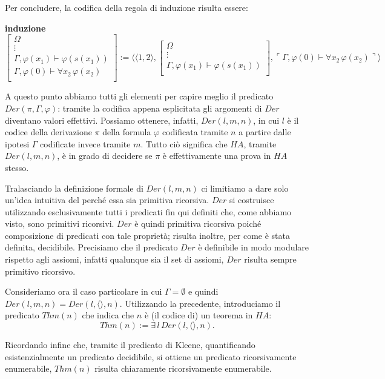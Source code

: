 Per concludere, la codifica della regola di induzione risulta essere:


\vspace{0.5cm}
\textbf{induzione}
{\tiny
$$
\left [
\begin{array}{c}
\Omega\\
\vdots\\
\Gamma, \varphi(x_1) \vdash \varphi(s(x_1))\\
\hline
\Gamma, \varphi(0) \vdash \forall x_2\,\varphi(x_2)\\
\end{array}
\right ]
:= \langle \langle 1, 2 \rangle ,
\left [
\begin{array}{c}
\Omega\\
\vdots\\
\Gamma, \varphi(x_1) \vdash \varphi(s(x_1))\\
\end{array}
\right ],
\ulcorner \Gamma, \varphi(0) \vdash \forall x_2\,\varphi(x_2) \urcorner \rangle
$$}

\vspace{0.5cm}

A questo punto abbiamo tutti gli elementi per capire meglio il predicato  $Der(\pi,\Gamma,\varphi)$: tramite la codifica appena esplicitata gli argomenti di $Der$ diventano valori effettivi. Possiamo ottenere, infatti, $Der(l, m, n)$, in cui $l$ \`e il codice della derivazione $\pi$ della formula $\varphi$ codificata tramite $n$ a partire dalle ipotesi $\Gamma$ codificate invece tramite $m$.
Tutto ci\`o significa che $HA$, tramite $Der(l,m,n)$, \`e in grado di decidere se $\pi$ \`e effettivamente una prova in $HA$ stesso.

Tralasciando la definizione formale di $Der(l,m,n)$ ci limitiamo a dare solo un'idea intuitiva del perch\'e essa sia primitiva ricorsiva. $Der$ si costruisce utilizzando esclusivamente tutti i predicati fin qui definiti che, come ab\-bia\-mo visto, sono primitivi ricorsivi.  $Der$ \`e quindi primitiva ricorsiva poich\'e composizione di predicati con tale propriet\`a; risulta inoltre, per come \`e stata definita, decidibile.
Precisiamo che il predicato $Der$ \`e definibile in modo modulare rispetto agli assiomi, infatti qualunque sia il set di assiomi, $Der$ risulta sempre primitivo ricorsivo.

Consideriamo ora il caso particolare in cui  $\Gamma = \emptyset$ e quindi $Der(l,m,n)=Der(l,\langle \rangle,n)$.
Utilizzando la precedente, introduciamo il predicato $Thm(n)$ che indica che $n$ \`e (il codice di) un teorema in $HA$:
$$
Thm(n) := \exists \, l \, Der(l,\langle \rangle,n) .
$$

Ricordando infine che, tramite il predicato di Kleene, quantificando esistenzialmente un predicato decidibile, si ottiene un predicato ricorsivamente enumerabile, $Thm(n)$ risulta chiaramente ricorsivamente enumerabile.
